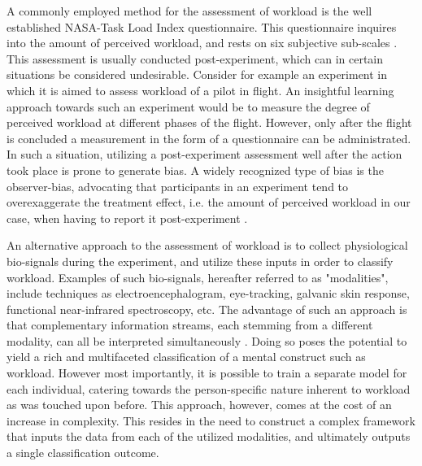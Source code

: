 \documentclass[12pt]{article}
\begin{document}
A commonly employed method for the assessment of workload is the well established NASA-Task Load Index questionnaire. This questionnaire inquires into the amount of perceived workload, and rests on six subjective sub-scales \cite{hart2006nasa}. This assessment is usually conducted post-experiment, which can in certain situations be considered undesirable. Consider for example an experiment in which it is aimed to assess workload of a pilot in flight. An insightful learning approach towards such an experiment would be to measure the degree of perceived workload at different phases of the flight. However, only after the flight is concluded a measurement in the form of a questionnaire can be administrated. In such a situation, utilizing a post-experiment assessment well after the action took place is prone to generate bias. A widely recognized type of bias is the observer-bias, advocating that participants in an experiment tend to overexaggerate the treatment effect, i.e. the amount of perceived workload in our case, when having to report it post-experiment \cite{mahtani2018catalogue}.

An alternative approach to the assessment of workload is to collect physiological bio-signals during the experiment, and utilize these inputs in order to classify workload. Examples of such bio-signals, hereafter referred to as "modalities", include techniques as electroencephalogram, eye-tracking, galvanic skin response, functional near-infrared spectroscopy, etc. The advantage of such an approach is that complementary information streams, each stemming from a different modality, can all be interpreted simultaneously \cite{ramachandram2017deep}. Doing so poses the potential to yield a rich and multifaceted classification of a mental construct such as workload. However most importantly, it is possible to train a separate model for each individual, catering towards the person-specific nature inherent to workload as was touched upon before. This approach, however, comes at the cost of an increase in complexity. This resides in the need to construct a complex framework that inputs the data from each of the utilized modalities, and ultimately outputs a single classification outcome. 
\end{document}
